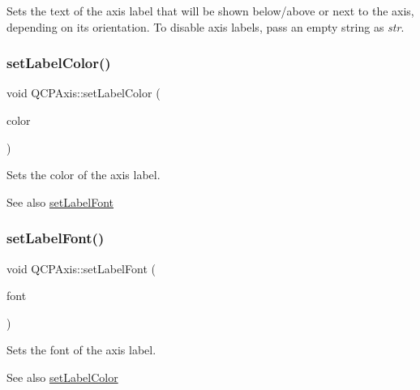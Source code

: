 Sets the text of the axis label that will be shown below/above or next to the axis, depending on its orientation. To disable axis labels, pass an empty string as {\itshape str}. \mbox{\label{class_q_c_p_axis_a6c906fe56d75f0122335b9f79b999608}} 
\subsubsection{\texorpdfstring{set\+Label\+Color()}{setLabelColor()}}
{\footnotesize\ttfamily void Q\+C\+P\+Axis\+::set\+Label\+Color (\begin{DoxyParamCaption}\item[{const Q\+Color \&}]{color }\end{DoxyParamCaption})}

Sets the color of the axis label.

\begin{DoxySeeAlso}{See also}
\hyperlink{class_q_c_p_axis_a71ac1a47f7547e490a8c4311d1433cf3}{set\+Label\+Font} 
\end{DoxySeeAlso}
\mbox{\label{class_q_c_p_axis_a71ac1a47f7547e490a8c4311d1433cf3}} 
\subsubsection{\texorpdfstring{set\+Label\+Font()}{setLabelFont()}}
{\footnotesize\ttfamily void Q\+C\+P\+Axis\+::set\+Label\+Font (\begin{DoxyParamCaption}\item[{const Q\+Font \&}]{font }\end{DoxyParamCaption})}

Sets the font of the axis label.

\begin{DoxySeeAlso}{See also}
\hyperlink{class_q_c_p_axis_a6c906fe56d75f0122335b9f79b999608}{set\+Label\+Color} 
\end{DoxySeeAlso}
\mbox{\label{class_q_c_p_axis_a4391192a766e5d20cfe5cbc17607a7a2}} 
